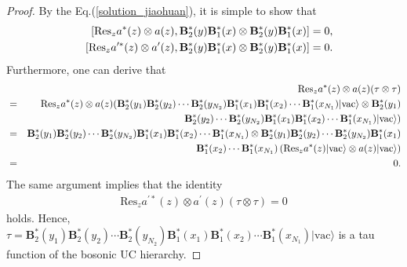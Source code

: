\documentclass[10pt,a4paper]{amsart}
\numberwithin{equation}{section}
\begin{document}
\begin{proof}
By the Eq.(\ref{solution_jiaohuan}), it is simple to show that
\begin{eqnarray}
&&\left[\text{Res}_{z}a^{\ast}(z)\otimes a(z),\mathbf{B}^{\ast}_{2}(y)\mathbf{B}^{\ast}_{1}(x)\otimes\mathbf{B}^{\ast}_{2}(y)
\mathbf{B}^{\ast}_{1}(x)\right]=0,\notag\\
&&\left[\text{Res}_{z}a^{\prime\ast}(z)\otimes a^{\prime}(z),\mathbf{B}^{\ast}_{2}(y)\mathbf{B}^{\ast}_{1}(x)\otimes\mathbf{B}^{\ast}_{2}(y)
\mathbf{B}^{\ast}_{1}(x)\right]=0.
\end{eqnarray}
Furthermore, one can derive that
\begin{eqnarray}
&&\text{Res}_{z}a^{\ast}(z)\otimes a(z)(\tau\otimes\tau)\notag\\
&=&\text{Res}_{z}a^{\ast}(z)\otimes a(z)(\mathbf{B}^{\ast}_{2}(y_{1})\mathbf{B}^{\ast}_{2}(y_{2})\cdots
\mathbf{B}^{\ast}_{2}(y_{N_{2}})\mathbf{B}^{\ast}_{1}(x_{1})
\mathbf{B}^{\ast}_{1}(x_{2})\cdots\mathbf{B}^{\ast}_{1}(x_{N_{1}})|\text{vac}
\rangle\otimes\mathbf{B}^{\ast}_{2}(y_{1})\notag\\
&&\mathbf{B}^{\ast}_{2}(y_{2})\cdots
\mathbf{B}^{\ast}_{2}(y_{N_{2}})\mathbf{B}^{\ast}_{1}(x_{1})
\mathbf{B}^{\ast}_{1}(x_{2})\cdots\mathbf{B}^{\ast}_{1}(x_{N_{1}})|
\text{vac}\rangle)\notag\\
&=&\mathbf{B}^{\ast}_{2}(y_{1})\mathbf{B}^{\ast}_{2}(y_{2})\cdots
\mathbf{B}^{\ast}_{2}(y_{N_{2}})\mathbf{B}^{\ast}_{1}(x_{1})
\mathbf{B}^{\ast}_{1}(x_{2})\cdots\mathbf{B}^{\ast}_{1}(x_{N_{1}})\otimes
\mathbf{B}^{\ast}_{2}(y_{1})\mathbf{B}^{\ast}_{2}(y_{2})\cdots
\mathbf{B}^{\ast}_{2}(y_{N_{2}})\mathbf{B}^{\ast}_{1}(x_{1})\notag\\
&&\mathbf{B}^{\ast}_{1}(x_{2})\cdots\mathbf{B}^{\ast}_{1}(x_{N_{1}})
\left(\text{Res}_{z}a^{\ast}(z)|\text{vac}\rangle\otimes a(z)|\text{vac}\rangle\right)\notag\\
&=&0.
\end{eqnarray}
The same argument implies that the identity
\begin{eqnarray}
\text{Res}_{z}a^{\prime\ast}(z)\otimes a^{\prime}(z)(\tau\otimes\tau)=0
\end{eqnarray}
holds. Hence, $\tau=\mathbf{B}^{\ast}_{2}(y_{1})\mathbf{B}^{\ast}_{2}(y_{2})\cdots
\mathbf{B}^{\ast}_{2}(y_{N_{2}})\mathbf{B}^{\ast}_{1}(x_{1})
\mathbf{B}^{\ast}_{1}(x_{2})\cdots\mathbf{B}^{\ast}_{1}(x_{N_{1}})|\text{vac}\rangle$ is a tau function of  the bosonic UC hierarchy.
\end{proof}
\end{document}
